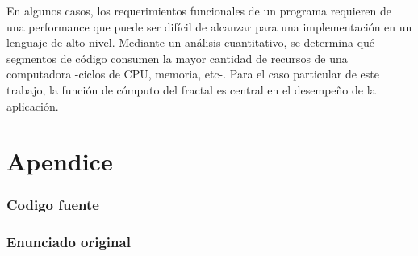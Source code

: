 \documentclass{article}
\begin{document}
En algunos casos, los requerimientos funcionales de un programa requieren de una performance que puede ser difícil de alcanzar para una implementación en un lenguaje de alto nivel. Mediante un análisis cuantitativo, se determina qué segmentos de código consumen la mayor cantidad de recursos de una computadora -ciclos de CPU, memoria, etc-. Para el caso particular de este trabajo, la función de cómputo del fractal es central en el desempeño de la aplicación.


\clearpage

\part{Apendice}
\appendix


\section{Codigo fuente}\label{sec:source}






\clearpage

\section{Enunciado original}\label{sec:enunciado}

\end{document}
